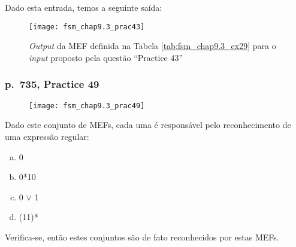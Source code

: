 \vspace{\baselineskip} \noindent
Dado esta entrada, temos a seguinte saída:
\begin{figure}[H]
    \centering
    \texttt{[image: fsm\_chap9.3\_prac43]}
    \caption{
        \textit{Output} da MEF definida na Tabela \ref{tab:fsm_chap9.3_ex29}
        para o \textit{input} proposto pela questão ``Practice 43''
    }
    \label{fig:fsm_chap9.3_prac43}
\end{figure}

\subsubsection*{p.\ 735, Practice 49}

\begin{figure}[H]
    \centering
    \texttt{[image: fsm\_chap9.3\_prac49]}
    \caption{\cite[p.\ 735, Practice 49]{judith}}
    \label{fig:fsm_chap9.3_prac49}
\end{figure}

\noindent
Dado este conjunto de MEFs, cada uma é responsável pelo reconhecimento de uma
expressão regular:

\begin{multicols}{4}
    \begin{enumerate}[(a)]
        \item 0
        \item 0*10
        \item 0 $\lor$ 1
        \item (11)*
    \end{enumerate}
\end{multicols}

\noindent
Verifica-se, então estes conjuntos são de fato reconhecidos por estas MEFs.

